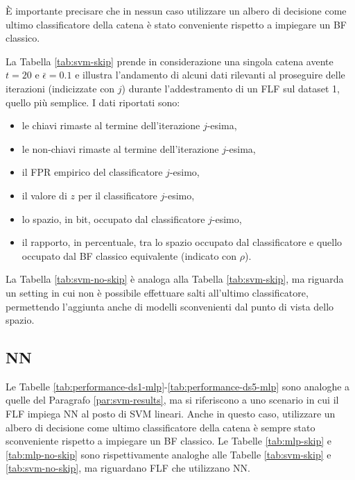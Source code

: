 È importante precisare che in nessun caso utilizzare un albero di decisione come ultimo classificatore della catena è stato conveniente rispetto a impiegare un BF classico.












La Tabella \ref{tab:svm-skip} prende in considerazione una singola catena avente $t=20$ e $\bar\epsilon=0.1$ e illustra l'andamento di alcuni dati rilevanti al proseguire delle iterazioni (indicizzate con $j$) durante l'addestramento di un FLF sul dataset 1, quello più semplice. I dati riportati sono:
\begin{itemize}
\item le chiavi rimaste al termine dell'iterazione $j$-esima,
\item le non-chiavi rimaste al termine dell'iterazione $j$-esima,
\item il FPR empirico del classificatore $j$-esimo,
\item il valore di $z$ per il classificatore $j$-esimo,
\item lo spazio, in bit, occupato dal classificatore $j$-esimo,
\item il rapporto, in percentuale, tra lo spazio occupato dal classificatore e quello occupato dal BF classico equivalente (indicato con $\rho$).
\end{itemize}

La Tabella \ref{tab:svm-no-skip} è analoga alla Tabella \ref{tab:svm-skip}, ma riguarda un setting in cui non è possibile effettuare salti all'ultimo classificatore, permettendo l'aggiunta anche di modelli sconvenienti dal punto di vista dello spazio.















\subsection{NN}

Le Tabelle \ref{tab:performance-ds1-mlp}-\ref{tab:performance-ds5-mlp} sono analoghe a quelle del Paragrafo \ref{par:svm-results}, ma si riferiscono a uno scenario in cui il FLF impiega NN al posto di SVM lineari.
Anche in questo caso, utilizzare un albero di decisione come ultimo classificatore della catena è sempre stato sconveniente rispetto a impiegare un BF classico.
Le Tabelle \ref{tab:mlp-skip} e \ref{tab:mlp-no-skip} sono rispettivamente analoghe alle Tabelle \ref{tab:svm-skip} e \ref{tab:svm-no-skip}, ma riguardano FLF che utilizzano NN.
















